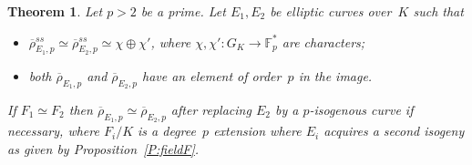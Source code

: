 \documentclass[12pt]{amsart}
\newcommand{\F}{\mathbb{F}}
\newcommand{\rhobar}{{\overline{\rho}}}
\numberwithin{equation}{section}
\newtheorem{theorem}{Theorem}[section]
\theoremstyle{definition}
\theoremstyle{remark}
\begin{document}
\begin{theorem} \label{T:reducible}
Let $p > 2$ be a prime. Let $E_1, E_2$ be elliptic curves 
over~$K$ such that 
\begin{itemize}
 \item[(i)] $\rhobar_{E_1,p}^{ss} \simeq \rhobar_{E_2,p}^{ss} \simeq \chi \oplus \chi'$,  where $\chi, \chi' : G_K \to \F_p^*$ are characters;
 \item[(ii)] both $\rhobar_{E_1,p}$ and $\rhobar_{E_2,p}$ have an element of
 order~$p$ in the image.
\end{itemize}
If $F_1 \simeq F_2$ then $\rhobar_{E_1,p} \simeq \rhobar_{E_2,p}$ 
after replacing $E_2$ by a $p$-isogenous curve if necessary, 
where $F_i/K$ is a degree~$p$ extension where $E_i$ acquires a second isogeny
as given by Proposition~\ref{P:fieldF}.
\end{theorem}
\end{document}
